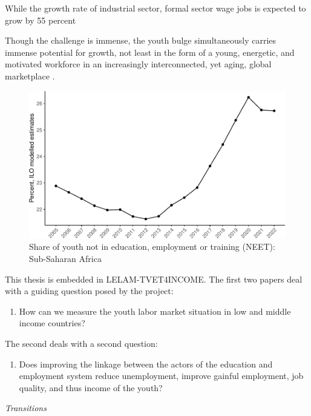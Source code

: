 \documentclass[
  a4paper, twoside, 12pt]{book}
\providecommand{\tightlist}{%
  \setlength{\itemsep}{0pt}\setlength{\parskip}{0pt}}
\begin{document}
While the growth rate of industrial sector, formal sector wage jobs is expected to grow by 55 percent

Though the challenge is immense, the youth bulge simultaneously carries immense potential for growth, not least in the form of a young, energetic, and motivated workforce in an increasingly interconnected, yet aging, global marketplace \autocite{filmer2014}.

\begin{figure}[H]
\includegraphics{figures/fig-neet-1} \caption{Share of youth not in education, employment or training (NEET):\newline{} Sub-Saharan Africa}\label{fig:fig-neet}
\end{figure}

This thesis is embedded in LELAM-TVET4INCOME. The first two papers deal with a guiding question posed by the project:

\begin{enumerate}
\def\labelenumi{\arabic{enumi}.}
\tightlist
\item
  How can we measure the youth labor market situation in low and middle income countries?
\end{enumerate}

The second deals with a second question:

\begin{enumerate}
\def\labelenumi{\arabic{enumi}.}
\setcounter{enumi}{1}
\tightlist
\item
  Does improving the linkage between the actors of the education and employment system reduce unemployment, improve gainful employment, job quality, and thus income of the youth?
\end{enumerate}

\emph{Transitions}
\end{document}
